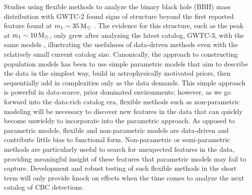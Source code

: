 Studies using flexible methods to analyze the binary black hole (BBH) mass distribution with GWTC-2 found signs of structure beyond the first reported feature found at 
$m_1\sim35\,{\rm M}_\odot$ \citep{Talbot_2018,o3a_pop,Tiwari_2021_b,Edelman_2022ApJ}. The evidence for this structure, 
such as the peak at $m_1\sim10\,{\rm M}_\odot$, only grew after analyzing the latest catalog, GWTC-3, with the same models \citep{o3b_astro_dist,Tiwari_2022ApJ}, illustrating  
the usefulness of data-driven methods even with the relatively small current catalog size. Canonically, the approach to constructing population models has been 
to use simple parametric models that aim to describe the data in the simplest way, build in astrophysically motivated priors, then sequentially add in 
complexities only as the data demands. This simple approach is powerful in data-scarce, prior dominated environments; however, as we go forward into 
the data-rich catalog era, flexible methods such as non-parametric modeling will be necessary to discover new features in the data that can quickly 
become unwieldy to incorporate into the parametric approach. As opposed to parametric models, flexible and non-parametric models are data-driven and 
contribute little bias to functional form. Non-parametric or semi-parametric methods are particularly useful to search for unexpected features in the 
data, providing meaningful insight of these features that parametric models may fail to capture. Development and robust testing of such flexible methods in the short 
term will only provide knock on effects when the time comes to analyze the next catalog of CBC detections.

